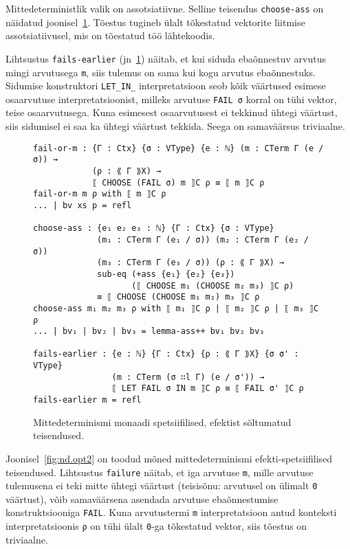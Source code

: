 \documentclass[a4paper,12pt]{article}
\begin{document}
Mittedeterministlik valik on assotsiatiivne. Selline teisendus {\tt choose-ass} on näidatud joonisel~\ref{fig:nd.opt1}. Tõestus tugineb ülalt tõkestatud vektorite liitmise assotsiatiivusel, mis on tõestatud töö lähtekoodis.

Lihtsustus {\tt fails-earlier} (jn~\ref{fig:nd.opt1}) näitab, et kui siduda ebaõnnestuv arvutus mingi arvutusega {\tt m}, siis tulemus on sama kui kogu arvutus ebaõnnestuks. Sidumise konstruktori {\tt LET_IN_} interpretatsioon seob kõik väärtused esimese osaarvutuse interpretatsioonist, milleks arvutuse {\tt FAIL σ} korral on tühi vektor, teise osaarvutusega. Kuna esimesest osaarvutusest ei tekkinud ühtegi väärtust, siis sidumisel ei saa ka ühtegi väärtust tekkida. Seega on samaväärsus triviaalne.
\begin{figure}
  \begin{BVerbatim}
fail-or-m : {Γ : Ctx} {σ : VType} {e : ℕ} (m : CTerm Γ (e / σ)) →
            (ρ : ⟪ Γ ⟫X) → 
            ⟦ CHOOSE (FAIL σ) m ⟧C ρ ≡ ⟦ m ⟧C ρ
fail-or-m m ρ with ⟦ m ⟧C ρ
... | bv xs p = refl

choose-ass : {e₁ e₂ e₃ : ℕ} {Γ : Ctx} {σ : VType}
             (m₁ : CTerm Γ (e₁ / σ)) (m₂ : CTerm Γ (e₂ / σ))
             (m₃ : CTerm Γ (e₃ / σ)) (ρ : ⟪ Γ ⟫X) →
             sub-eq (+ass {e₁} {e₂} {e₃})
                    (⟦ CHOOSE m₁ (CHOOSE m₂ m₃) ⟧C ρ)
             ≡ ⟦ CHOOSE (CHOOSE m₁ m₂) m₃ ⟧C ρ
choose-ass m₁ m₂ m₃ ρ with ⟦ m₁ ⟧C ρ | ⟦ m₂ ⟧C ρ | ⟦ m₃ ⟧C ρ
... | bv₁ | bv₂ | bv₃ = lemma-ass++ bv₁ bv₂ bv₃

fails-earlier : {e : ℕ} {Γ : Ctx} {ρ : ⟪ Γ ⟫X} {σ σ' : VType}
                (m : CTerm (σ ∷l Γ) (e / σ')) →
                ⟦ LET FAIL σ IN m ⟧C ρ ≡ ⟦ FAIL σ' ⟧C ρ
fails-earlier m = refl
  \end{BVerbatim}
  \caption{Mittedeterminismi monaadi spetsiifilised, efektist sõltumatud teisendused.}
  \label{fig:nd.opt1}
\end{figure}

Joonisel~\ref{fig:nd.opt2} on toodud mõned mittedeterminismi efekti-spetsiifilised teisendused. Lihtsustus {\tt failure} näitab, et iga arvutuse {\tt m}, mille arvutuse tulemusena ei teki mitte ühtegi väärtust (teisisõnu: arvutusel on ülimalt {\tt 0} väärtust), võib samaväärsena asendada arvutuse ebaõnnestumise konstruktsiooniga {\tt FAIL}. Kuna arvutustermi {\tt m} interpretatsioon antud konteksti interpretatsioonis {\tt ρ} on tühi ülalt {\tt 0}-ga tõkestatud vektor, siis tõestus on triviaalne.
\end{document}
